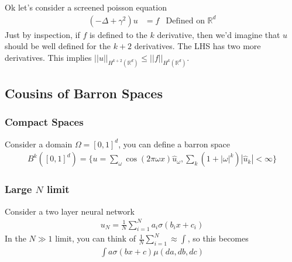 Ok let's consider a screened poisson equation
\begin{align}
	(-\Delta + \gamma^2) u & = f & \text{Defined on } \mathbb R^d
\end{align}
Just by inspection, if $f$ is defined to the $k$ derivative, then we'd imagine that $u$ should be well defined for the $k+2$ derivatives. The LHS has two more derivatives. This implies $||u||_{H^{k+2}(\mathbb R^d)} \leq ||f||_{H^k(\mathbb R^d)}$.

\subsection{Cousins of Barron Spaces}
\subsubsection{Compact Spaces}
Consider a domain $\Omega = [0,1]^d$, you can define a barron space 
\begin{align}
	B^k([0,1]^d) = \{u= \sum_\omega \cos(2\pi \omega x) \hat u_\omega, \sum_k (1 + |\omega|^k ) |\hat u_k|< \infty\}
\end{align}

\subsubsection{Large $N$ limit}
Consider a two layer neural network
\begin{align}
	u_N = \frac{1}{N} \sum_{i=1}^N a_i \sigma(b_i x +c_i)
\end{align}
In the $N \gg 1$ limit, you can think of $\frac{1}{N} \sum_{i=1}^N \approx \int$, so this becomes
\begin{align}
	\int a\sigma(b x + c) \mu(da, db, dc)
\end{align}













































